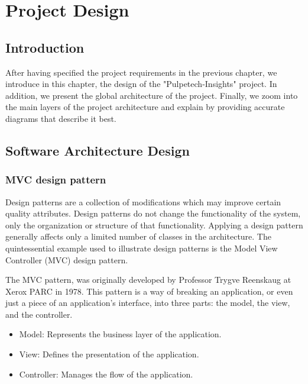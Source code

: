 \chapter{Project Design}

\section*{Introduction}
After having specified the project requirements in the previous chapter, we introduce in this chapter,
the design of the "Pulpetech-Insights" project. In addition, we present the global architecture of the project.
Finally, we  zoom into the main layers of the project architecture and explain by providing accurate diagrams that describe it best.

\pagebreak

\section{Software Architecture Design}
\subsection{MVC design pattern}
Design patterns are a collection of modifications which may improve certain quality attributes.
Design patterns do not change the functionality of the system, only the organization or structure of that functionality.
Applying a design pattern generally affects only a limited number of classes in the architecture.
The quintessential example used to illustrate design patterns is the Model View Controller
(MVC) design pattern.

The MVC pattern, was originally developed by Professor Trygve Reenskaug at Xerox PARC in 1978.
This pattern \cite{mvc} is a way of breaking an application, or even just a piece of an application’s interface, into three parts: the model, the view, and the controller.
\begin{itemize}
    \item Model:
    Represents the business layer of the application.
    \item View:
    Defines the presentation of the application.
    \item Controller:
    Manages the flow of the application.
\end{itemize}


